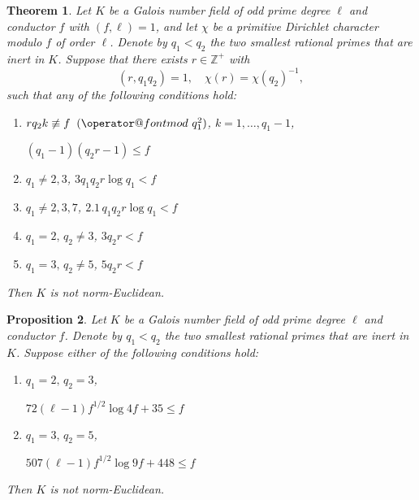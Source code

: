 \documentclass{amsart}
\newtheorem{theorem}{Theorem}[section]
\newtheorem{proposition}[theorem]{Proposition}
\numberwithin{equation}{section}
\numberwithin{table}{section}
\begin{document}
\begin{theorem}\label{T:conditions}
  Let $K$ be a Galois number field of odd prime degree $\ell$ and conductor $f$ with $(f,\ell)=1$,
  and
  let $\chi$ be a primitive Dirichlet character modulo $f$ of order $\ell$.
  Denote by $q_1<q_ 2$ the two smallest rational primes that are inert in $K$.
  Suppose that there exists $r\in{\mathbb{Z}}^+$ with
  $$
    (r,q_1 q_2)=1,
    \quad
    \chi(r)=\chi(q_2)^{-1},
  $$
  such that any of the following conditions hold:
  
  \begin{enumerate}
    \item
    \qquad
    
    $r q_2 k\not\equiv f {\allowbreak\mkern10mu({\operator@font mod}\,\,{q_1^2})}$, \quad $k=1,\dots,q_1-1$,
    
    \quad\hspace{-1ex}
    $(q_1-1)(q_2 r-1)\leq f$
    
  \item
  \qquad
  $q_1\neq 2,3$,
  \quad
  $3q_1 q_2 r\log q_1< f $

  \item
  \qquad
  $q_1\neq 2,3,7$,
  \quad
  $2.1\,q_1 q_2 r\log q_1< f$
  
  \item
  \qquad
  $q_1=2,\,q_2\neq 3$,
  \quad
  $3q_2 r< f$
  
  \item
  \qquad
  $q_1=3,\,q_2\neq 5$,
  \quad
  $5q_2 r< f$
  \end{enumerate}
   Then $K$ is not norm-Euclidean.
\end{theorem}

\begin{proposition}\label{P:special}
Let $K$ be a Galois number field of odd prime degree $\ell$ and conductor $f$.
Denote by $q_1<q_ 2$ the two smallest rational primes that are inert in $K$.
Suppose either of the following conditions hold:
\begin{enumerate}
  \item
    \qquad
    $q_1=2,\, q_2=3$,
    
    \quad\hspace{-1ex}
    $72(\ell-1)f^{1/2}\log 4f+35\leq f$
  \item
    \qquad
      $q_1=3,\, q_2=5$,
      
    \quad\hspace{-1ex}
      
      $507(\ell-1)f^{1/2}\log 9f+448\leq f$
\end{enumerate}
Then $K$ is not norm-Euclidean.
\end{proposition}
\end{document}
